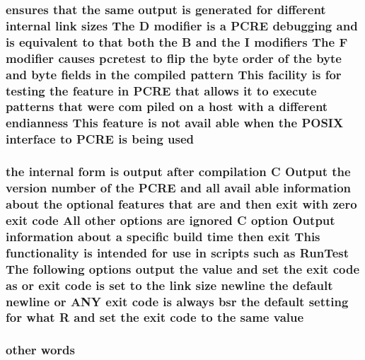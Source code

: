 \subsubsection[{\texorpdfstring{used}{used}}]{ ensures that the same {\bf output} {\bf is} {\bf generated} for different internal link sizes The {\bf D} {\bf modifier} {\bf is} {\bf a} {\bf P\+C\+RE} debugging and {\bf is} equivalent {\bf to} that both the {\bf B} and the {\bf I} {\bf modifiers} The {\bf F} {\bf modifier} causes {\bf pcretest} {\bf to} flip the byte {\bf order} {\bf of} the byte and byte {\bf fields} {\bf in} the {\bf compiled} {\bf pattern} This {\bf facility} {\bf is} for testing the {\bf feature} {\bf in} {\bf P\+C\+RE} that allows {\bf it} {\bf to} execute {\bf patterns} that were com piled {\bf on} {\bf a} {\bf host} {\bf with} {\bf a} different endianness This {\bf feature} {\bf is} {\bf not} avail {\bf able} when the P\+O\+S\+IX interface {\bf to} {\bf P\+C\+RE} {\bf is} being used}\hypertarget{pcretest_8txt_a3deefce4f8a55b352a0b81b0b8065ec0}{}\label{pcretest_8txt_a3deefce4f8a55b352a0b81b0b8065ec0}
\subsubsection[{\texorpdfstring{value}{value}}]{\setlength{\rightskip}{0pt plus 5cm}the internal form {\bf is} {\bf output} {\bf after} {\bf compilation} {\bf C} Output the version {\bf number} {\bf of} the {\bf P\+C\+RE} and {\bf all} avail {\bf able} information about the {\bf optional} {\bf features} that {\bf are} and then {\bf exit} {\bf with} {\bf zero} {\bf exit} {\bf code} All other {\bf options} {\bf are} {\bf ignored} {\bf C} {\bf option} Output information about {\bf a} specific build {\bf time} then {\bf exit} This functionality {\bf is} intended for use {\bf in} {\bf scripts} such {\bf as} Run\+Test The following {\bf options} {\bf output} the value and {\bf set} the {\bf exit} {\bf code} {\bf as} {\bf or} {\bf exit} {\bf code} {\bf is} {\bf set} {\bf to} the link {\bf size} {\bf newline} the {\bf default} {\bf newline} {\bf or} A\+NY {\bf exit} {\bf code} {\bf is} always bsr the {\bf default} {\bf setting} for {\bf what} {\bf R} and {\bf set} the {\bf exit} {\bf code} {\bf to} the same value}\hypertarget{pcretest_8txt_a262ad32c75be9b93a7a77b045ed14fe0}{}\label{pcretest_8txt_a262ad32c75be9b93a7a77b045ed14fe0}
\subsubsection[{\texorpdfstring{words}{words}}]{ other words}\hypertarget{pcretest_8txt_a35ea1570736a7bf51e1836cb77981757}{}\label{pcretest_8txt_a35ea1570736a7bf51e1836cb77981757}

